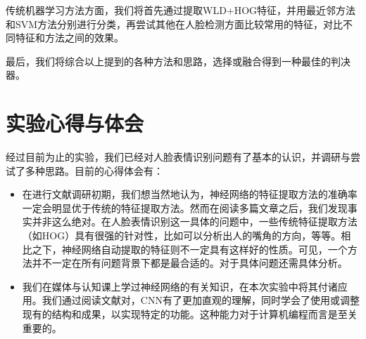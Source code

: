 \documentclass[UTF8]{ctexart}
\begin{document}
传统机器学习方法方面，我们将首先通过提取WLD+HOG特征，并用最近邻方法和SVM方法分别进行分类，再尝试其他在人脸检测方面比较常用的特征，对比不同特征和方法之间的效果。

最后，我们将综合以上提到的各种方法和思路，选择或融合得到一种最佳的判决器。

\section{实验心得与体会}

经过目前为止的实验，我们已经对人脸表情识别问题有了基本的认识，并调研与尝试了多种思路。目前的心得体会有：
\begin{itemize}
  \item 在进行文献调研初期，我们想当然地认为，神经网络的特征提取方法的准确率一定会明显优于传统的特征提取方法。然而在阅读多篇文章之后，我们发现事实并非这么绝对。在人脸表情识别这一具体的问题中，一些传统特征提取方法（如HOG）具有很强的针对性，比如可以分析出人的嘴角的方向，等等。相比之下，神经网络自动提取的特征则不一定具有这样好的性质。可见，一个方法并不一定在所有问题背景下都是最合适的。对于具体问题还需具体分析。
  \item 我们在媒体与认知课上学过神经网络的有关知识，在本次实验中将其付诸应用。我们通过阅读文献对，CNN有了更加直观的理解，同时学会了使用或调整现有的结构和成果，以实现特定的功能。这种能力对于计算机编程而言是至关重要的。
\end{itemize}



\end{document}
